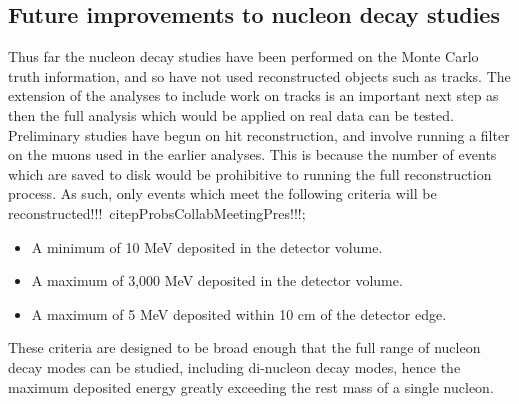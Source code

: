 \subsection{Future improvements to nucleon decay studies}
Thus far the nucleon decay studies have been performed on the Monte Carlo truth information, and so have not used reconstructed objects such as tracks. The extension of the analyses to include work on tracks is an important next step as then the full analysis which would be applied on real data can be tested. Preliminary studies have begun on hit reconstruction, and involve running a filter on the muons used in the earlier analyses. This is because the number of events which are saved to disk would be prohibitive to running the full reconstruction process. As such, only events which meet the following criteria will be reconstructed!!!~citep{ProbsCollabMeetingPres}!!!;
\begin{itemize}
\item A minimum of 10 MeV deposited in the detector volume.
\item A maximum of 3,000 MeV deposited in the detector volume.
\item A maximum of 5 MeV deposited within 10 cm of the detector edge.
\end{itemize}
These criteria are designed to be broad enough that the full range of nucleon decay modes can be studied, including di-nucleon decay modes, hence the maximum deposited energy greatly exceeding the rest mass of a single nucleon. \\
